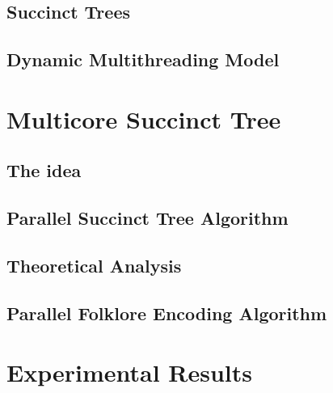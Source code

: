 \documentclass{sig-alternate}
\begin{document}
\subsection{Succinct Trees}
\label{subsec:suctrees}


\subsection{Dynamic Multithreading Model}
\label{subsec:dym}


%


\section{Multicore Succinct Tree}
\label{sec:multicoreST}


\subsection{The idea}
\label{subsec:idea}


\subsection{Parallel Succinct Tree Algorithm}
\label{subsec:multicoreSTAlgorithm}


\subsection{Theoretical Analysis}
\label{subsec:theoreticalAnalysis}


\subsection{Parallel Folklore Encoding Algorithm}
\label{subsec:parenthesesAlgorithm}


\section{Experimental Results}
\label{sec:exps}

\end{document}
